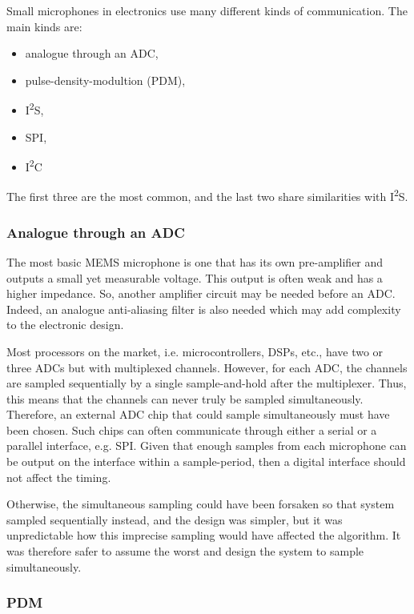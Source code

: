 \documentclass[notitlepage]{report}
\begin{document}
Small microphones in electronics use many different kinds of communication. The main kinds are:
\begin{itemize}
	\item analogue through an ADC,
	\item pulse-density-modultion (PDM),
	\item I\textsuperscript{2}S, 
	\item SPI,
	\item I\textsuperscript{2}C
\end{itemize}

The first three are the most common, and the last two share similarities with I\textsuperscript{2}S.

\subsubsection{Analogue through an ADC}

The most basic MEMS microphone is one that has its own pre-amplifier and outputs a small yet measurable voltage\cite{lewis_analog_nodate}. This output is often weak and has a higher impedance. So, another amplifier circuit may be needed before an ADC. Indeed, an analogue anti-aliasing filter is also needed which may add complexity to the electronic design.

Most processors on the market, i.e. microcontrollers, DSPs, etc., have two or three ADCs but with multiplexed channels. However, for each ADC, the channels are sampled sequentially by a single sample-and-hold after the multiplexer. Thus, this means that the channels can never truly be sampled simultaneously. Therefore, an external ADC chip that could sample simultaneously must have been chosen. Such chips can often communicate through either a serial or a parallel interface, e.g. SPI. Given that enough samples from each microphone can be output on the interface within a sample-period, then a digital interface should not affect the timing.

Otherwise, the simultaneous sampling could have been forsaken so that system sampled sequentially instead, and the design was simpler, but it was unpredictable how this imprecise sampling would have affected the algorithm. It was therefore safer to assume the worst and design the system to sample simultaneously.

\subsubsection{PDM}
\end{document}
